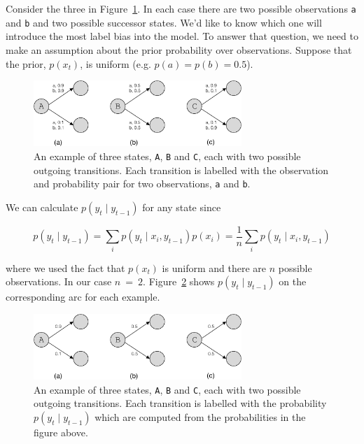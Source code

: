 \documentclass[11pt, letterpaper]{article}
\begin{document}
Consider the three in Figure~\ref{fig:entropy}. In each case there are two possible
observations \texttt{a} and \texttt{b} and two possible successor states. We'd
like to know which one will introduce the most label bias into the model. To
answer that question, we need to make an assumption about the prior probability
over observations. Suppose that the prior, $p(x_t)$, is uniform (e.g. $p(a) =
p(b) = 0.5$).

\begin{figure}
    \centering
    \includegraphics[width=0.7\textwidth]{figures/entropy_example.pdf}
    \caption{An example of three states, \texttt{A}, \texttt{B} and \texttt{C},
    each with two possible outgoing transitions. Each transition is labelled
    with the observation and probability pair for two observations, \texttt{a}
    and \texttt{b}.}
    \label{fig:entropy}
\end{figure}

We can calculate $p(y_t \mid y_{t-1})$ for any state since

\begin{equation}
p(y_t \mid y_{t-1}) = \sum_i p(y_t \mid x_i, y_{t-1}) p(x_i) = \frac{1}{n} \sum_i p(y_t \mid x_i, y_{t-1})
\end{equation}

where we used the fact that $p(x_t)$ is uniform and there are $n$ possible
observations. In our case $n\!~=\!~2$. Figure~\ref{fig:entropy_no_obs} shows
$p(y_t \mid y_{t-1})$ on the corresponding arc for each example.

\begin{figure}
    \centering
    \includegraphics[width=0.7\textwidth]{figures/entropy_example_no_obs.pdf}
    \caption{An example of three states, \texttt{A}, \texttt{B} and \texttt{C},
    each with two possible outgoing transitions.  Each transition is labelled
    with the probability $p(y_t \mid y_{t-1})$ which are computed from the
    probabilities in the figure above.}
    \label{fig:entropy_no_obs}
\end{figure}
\end{document}
